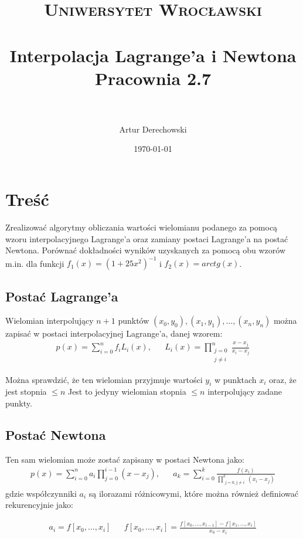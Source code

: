 \documentclass[paper=a4, fontsize=11pt]{scrartcl} %
\title{	
\normalfont \normalsize 
\textsc{Uniwersytet Wrocławski} \\ [25pt] %
\horrule{0.5pt} \\[0.4cm] %
\huge Interpolacja Lagrange'a i Newtona \\
\large Pracownia 2.7 \\ %
\horrule{2pt} \\[0.5cm] %
}
\author{Artur Derechowski} %
\date{\normalsize\today} %
\numberwithin{equation}{section} %
\numberwithin{figure}{section} %
\numberwithin{table}{section} %
\begin{document}
\maketitle %


\section{Treść}
Zrealizować algorytmy obliczania wartości wielomianu podanego za pomocą wzoru interpolacyjnego
Lagrange’a oraz zamiany postaci Lagrange’a na postać Newtona. Porównać dokładności wyników uzyskanych
za pomocą obu wzorów m.in. dla funkcji ${f_1(x) = (1+25x^2)^{-1}}$
i ${f_2(x) = arctg(x)}$.

\subsection{Postać Lagrange'a}
Wielomian interpolujący ${n+1}$ punktów ${(x_0, y_0), (x_1, y_1), ... , (x_n, y_n)}$ można zapisać
w postaci interpolacyjnej Lagrange'a, danej wzorem:
\begin{align} 
 p(x)= \sum_{i=0}^{n} f_i L_i(x), &&	\label{lag}
 L_i(x) = \prod_{\substack{j=0 \\ j \neq i}}^n \frac{x-x_j}{x_i-x_j}
\end{align}

Można sprawdzić, że ten wielomian przyjmuje wartości $y_i$ w punktach $x_i$ oraz, że jest
stopnia $\leqslant n$
Jest to jedyny wielomian stopnia ${\leqslant n}$ interpolujący zadane punkty. \medbreak
 
\subsection{Postać Newtona}
Ten sam wielomian może zostać zapisany w postaci Newtona jako:
\begin{align} 
 p(x)= \sum_{i=0}^{n} a_i \prod_{j=0}^{i-1} (x-x_j), && \label{new}
 a_k = \sum_{i=0}^k \frac{f(x_i)} {\prod_{\substack{j=0, j \neq i}}^k (x_i - x_j)}
\end{align}
gdzie współczynniki ${a_i}$ są ilorazami różnicowymi, które można również definiować rekurencyjnie jako:

\begin{align}
a_i = f[x_0,..., x_i] &&
f[x_0,..., x_i] = \frac{f[x_0,..., x_{i-1}] - f[x_1,..., x_i]}{x_0 - x_i}
\end{align}
\end{document}
